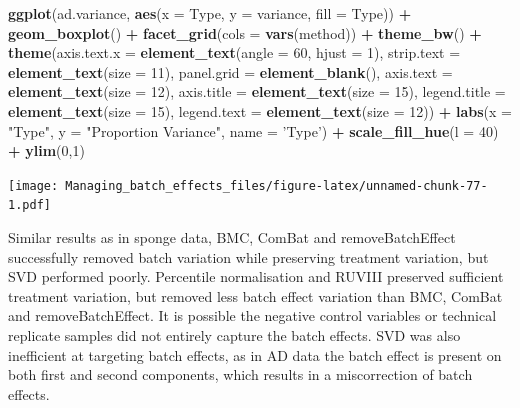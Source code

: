 \documentclass[]{book}
\newenvironment{Shaded}{\begin{snugshade}}{\end{snugshade}}
\newcommand{\KeywordTok}[1]{\textcolor[rgb]{0.13,0.29,0.53}{\textbf{#1}}}
\newcommand{\DataTypeTok}[1]{\textcolor[rgb]{0.13,0.29,0.53}{#1}}
\newcommand{\DecValTok}[1]{\textcolor[rgb]{0.00,0.00,0.81}{#1}}
\newcommand{\StringTok}[1]{\textcolor[rgb]{0.31,0.60,0.02}{#1}}
\newcommand{\OperatorTok}[1]{\textcolor[rgb]{0.81,0.36,0.00}{\textbf{#1}}}
\newcommand{\NormalTok}[1]{#1}
\begin{document}
\begin{Shaded}
\begin{Highlighting}[]
\KeywordTok{ggplot}\NormalTok{(ad.variance, }\KeywordTok{aes}\NormalTok{(}\DataTypeTok{x =}\NormalTok{ Type, }\DataTypeTok{y =}\NormalTok{ variance, }\DataTypeTok{fill =}\NormalTok{ Type)) }\OperatorTok{+}\StringTok{ }
\StringTok{  }\KeywordTok{geom_boxplot}\NormalTok{() }\OperatorTok{+}\StringTok{ }\KeywordTok{facet_grid}\NormalTok{(}\DataTypeTok{cols =} \KeywordTok{vars}\NormalTok{(method)) }\OperatorTok{+}\StringTok{ }\KeywordTok{theme_bw}\NormalTok{() }\OperatorTok{+}\StringTok{ }
\StringTok{  }\KeywordTok{theme}\NormalTok{(}\DataTypeTok{axis.text.x =} \KeywordTok{element_text}\NormalTok{(}\DataTypeTok{angle =} \DecValTok{60}\NormalTok{, }\DataTypeTok{hjust =} \DecValTok{1}\NormalTok{), }
        \DataTypeTok{strip.text =} \KeywordTok{element_text}\NormalTok{(}\DataTypeTok{size =} \DecValTok{11}\NormalTok{), }\DataTypeTok{panel.grid =} \KeywordTok{element_blank}\NormalTok{(), }
        \DataTypeTok{axis.text =} \KeywordTok{element_text}\NormalTok{(}\DataTypeTok{size =} \DecValTok{12}\NormalTok{), }\DataTypeTok{axis.title =} \KeywordTok{element_text}\NormalTok{(}\DataTypeTok{size =} \DecValTok{15}\NormalTok{),}
        \DataTypeTok{legend.title =} \KeywordTok{element_text}\NormalTok{(}\DataTypeTok{size =} \DecValTok{15}\NormalTok{), }\DataTypeTok{legend.text =} \KeywordTok{element_text}\NormalTok{(}\DataTypeTok{size =} \DecValTok{12}\NormalTok{)) }\OperatorTok{+}\StringTok{ }
\StringTok{  }\KeywordTok{labs}\NormalTok{(}\DataTypeTok{x =} \StringTok{"Type"}\NormalTok{, }\DataTypeTok{y =} \StringTok{"Proportion Variance"}\NormalTok{, }\DataTypeTok{name =} \StringTok{'Type'}\NormalTok{) }\OperatorTok{+}\StringTok{ }
\StringTok{  }\KeywordTok{scale_fill_hue}\NormalTok{(}\DataTypeTok{l =} \DecValTok{40}\NormalTok{) }\OperatorTok{+}\StringTok{ }\KeywordTok{ylim}\NormalTok{(}\DecValTok{0}\NormalTok{,}\DecValTok{1}\NormalTok{)}
\end{Highlighting}
\end{Shaded}

\texttt{[image: Managing\_batch\_effects\_files/figure-latex/unnamed-chunk-77-1.pdf]}

Similar results as in sponge data, BMC, ComBat and removeBatchEffect
successfully removed batch variation while preserving treatment
variation, but SVD performed poorly. Percentile normalisation and RUVIII
preserved sufficient treatment variation, but removed less batch effect
variation than BMC, ComBat and removeBatchEffect. It is possible the
negative control variables or technical replicate samples did not
entirely capture the batch effects. SVD was also inefficient at
targeting batch effects, as in AD data the batch effect is present on
both first and second components, which results in a miscorrection of
batch effects.
\end{document}
